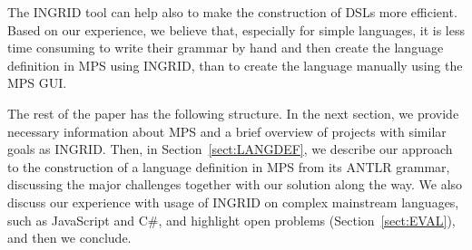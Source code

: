 The INGRID tool can help also to make the construction of DSLs more efficient.
Based on our experience, we believe that, especially for simple languages, it is less time consuming to write their grammar by hand and then create the language definition in MPS using INGRID, than to create the language manually using the MPS GUI.


The rest of the paper has the following structure.
In the next section, we provide necessary information about MPS and a brief overview of projects with similar goals as INGRID.
Then, in Section~\ref{sect:LANGDEF}, we describe our approach to the construction of a language definition in MPS from its ANTLR grammar, discussing the major challenges together with our solution along the way.
We also discuss our experience with usage of INGRID on complex mainstream languages, such as JavaScript and C\#, and highlight open problems (Section~\ref{sect:EVAL}), and then we conclude.

